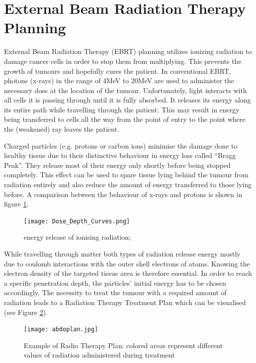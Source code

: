 \section{External Beam Radiation Therapy Planning}
\label{sec:planning}
External Beam Radiation Therapy (EBRT) planning utilizes ionizing radiation to damage cancer cells in order to stop them from multiplying.
This prevents the growth of tumours and hopefully cures the patient. 
In conventional EBRT, photons (x-rays) in the range of 4MeV to 20MeV are used to administer the necessary dose at the location of the tumour.
Unfortunately, light interacts with all cells it is passing through until it is fully absorbed.
It releases its energy along its entire path while travelling through the patient.
This may result in energy being transferred to cells all the way from the point of entry to the point where the (weakened) ray leaves the patient.

Charged particles (e.g. protons or carbon ions) minimise the damage done to healthy tissue due to their distinctive behaviour in energy loss called ``Bragg Peak''.
They release most of their energy only shortly before being stopped completely.
\cite{Nakamura2010} This effect can be used to spare tissue lying behind the tumour from radiation entirely and also reduce the amount of energy transferred to those lying before. \cite{Paganetti2005}
A comparison between the behaviour of x-rays and protons is shown in figure \ref{fig:bragg}.

\begin{figure}[!h]
	\centering
	\texttt{[image: Dose\_Depth\_Curves.png]}
	\caption{energy release of ionising radiation; \cite{Cepheiden}}
	\label{fig:bragg}
\end{figure}

While travelling through matter both types of radiation release energy mostly due to coulomb interactions with the outer shell electrons of atoms.
Knowing the electron density of the targeted tissue area is therefore essential.
In order to reach a specific penetration depth, the particles' initial energy has to be chosen accordingly.
The necessity to treat the tumour with a required amount of radiation leads to a Radiation Therapy Treatment Plan which can be visualised (see Figure \ref{fig:plan}).

\begin{figure}[!tbh]
	\centering
	\texttt{[image: abdoplan.jpg]}
	\caption{Example of Radio Therapy Plan: colored areas represent different values of radiation administered during treatment }
	\label{fig:plan}
\end{figure}


